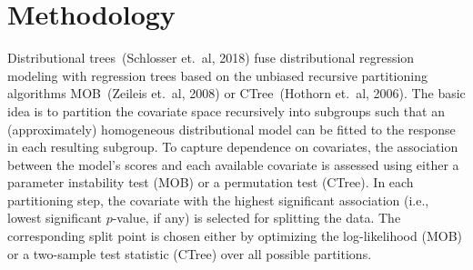 \documentclass[twoside]{report}
\begin{document}

\section{Methodology}

Distributional trees~(Schlosser et.~al, 2018) fuse distributional regression modeling with
regression trees based on the unbiased recursive partitioning algorithms MOB~(Zeileis et.~al, 2008)
or CTree~(Hothorn et.~al, 2006). The basic idea is to partition the covariate space recursively into 
subgroups such that an (approximately) homogeneous distributional model can be fitted to the response 
in each resulting subgroup.
To capture dependence on covariates, the association between the model's scores and each available
covariate is assessed using either a parameter instability test (MOB) or a permutation test (CTree).
In each partitioning step, the covariate with the highest significant association (i.e., lowest
significant $p$-value, if any) is selected for splitting the data. The corresponding split point
is chosen either by optimizing the log-likelihood (MOB) or a two-sample test statistic (CTree)
over all possible partitions.
\end{document}
